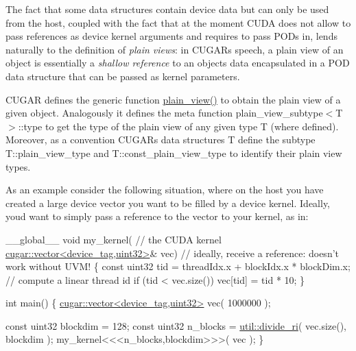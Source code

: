 \begin{DoxyParagraph}{}
The fact that some data structures contain device data but can only be used from the host, coupled with the fact that at the moment C\+U\+DA does not allow to pass references as device kernel arguments and requires to pass P\+O\+Ds in, lends naturally to the definition of {\itshape plain views}\+: in C\+U\+G\+AR\textquotesingle{}s speech, a plain view of an object is essentially a {\itshape shallow reference} to an object\textquotesingle{}s data encapsulated in a P\+OD data structure that can be passed as kernel parameters. 
\end{DoxyParagraph}
\begin{DoxyParagraph}{}
C\+U\+G\+AR defines the generic function \hyperlink{group___basic_ga6eb01f34e803fa6b384bf9930f6db426}{plain\+\_\+view()} to obtain the plain view of a given object. Analogously it defines the meta function plain\+\_\+view\+\_\+subtype$<$\+T$>$\+::type to get the type of the plain view of any given type T (where defined). Moreover, as a convention C\+U\+G\+AR\textquotesingle{}s data structures T define the subtype T\+::plain\+\_\+view\+\_\+type and T\+::const\+\_\+plain\+\_\+view\+\_\+type to identify their plain view types. 
\end{DoxyParagraph}
\begin{DoxyParagraph}{}
As an example consider the following situation, where on the host you have created a large device vector you want to be filled by a device kernel. Ideally, you\textquotesingle{}d want to simply pass a reference to the vector to your kernel, as in\+: 
\begin{DoxyCode}
\_\_global\_\_ \textcolor{keywordtype}{void} my\_kernel(                   \textcolor{comment}{// the CUDA kernel}
    \hyperlink{structcugar_1_1vector}{cugar::vector<device\_tag,uint32>}& vec)   \textcolor{comment}{// ideally, receive a
       reference: doesn't work without UVM!}
\{
    \textcolor{keyword}{const} uint32 tid = threadIdx.x + blockIdx.x * blockDim.x; \textcolor{comment}{// compute a linear thread id}
    \textcolor{keywordflow}{if} (tid < vec.size())
        vec[tid] = tid * 10;
\}

\textcolor{keywordtype}{int} main()
\{
    \hyperlink{structcugar_1_1vector}{cugar::vector<device\_tag,uint32>} vec( 1000000 );

    \textcolor{keyword}{const} uint32 blockdim = 128;
    \textcolor{keyword}{const} uint32 n\_blocks = \hyperlink{group___basic_utils_gabb6714186dbbd864f0a9298944ba509b}{util::divide\_ri}( vec.size(), blockdim ); 
    my\_kernel<<<n\_blocks,blockdim>>>( vec );
\}
\end{DoxyCode}
 
\end{DoxyParagraph}
